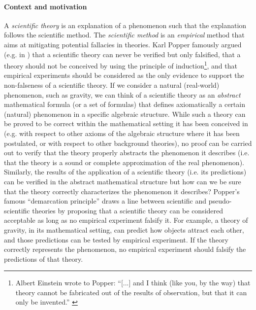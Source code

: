 \documentclass[conference]{IEEEtran}
\begin{document}
\paragraph{Context and motivation} 
A \emph{scientific theory} is an explanation of a phenomenon such that the
explanation follows the scientific method. The \emph{scientific method} is an
\emph{empirical} method that aims at mitigating potential fallacies in
theories.  Karl Popper famously argued (e.g. in \autocite{Popper1959logic})
that a scientific theory can never be verified but only falsified, that a
theory should not be conceived by using the principle of
induction\footnote{Albert  Einstein wrote to Popper: ``[...] and I think (like
you, by the way) that theory cannot be fabricated out of the results of
observation, but that it can only be invented.'' \autocite{Popper1959logic}},
and that empirical experiments should be considered as the only evidence to
support the non-falseness of a scientific theory. 
If we consider a natural (real-world) phenomenon, such as gravity, we can think
of a scientific theory as an \emph{abstract} mathematical formula (or a set of
formulas) that defines axiomatically a certain (natural) phenomenon in a
specific algebraic structure. While such a theory can be proved to be correct
within the mathematical setting it has been conceived in (e.g. with respect to
other axioms of the algebraic structure where it has been postulated, or with
respect to other background theories), no proof can be carried out to verify
that the theory properly abstracts the phenomenon it describes (i.e. that the
theory is a sound or complete approximation of the real phenomenon).
Similarly, the results of the application of a scientific theory (i.e. its
predictions) can be verified in the abstract mathematical structure but how can
we be sure that the theory correctly characterizes the phenomenon it describes? 
Popper's famous ``demarcation principle'' draws a line between scientific and
pseudo-scientific theories by proposing that a scientific theory can
be considered acceptable as long as no empirical experiment falsify it. For
example, a theory of gravity, in its mathematical setting, can predict how
objects attract each other, and those predictions can be tested by empirical
experiment. If the theory correctly represents the phenomenon, no empirical
experiment should falsify the predictions of that theory.
\end{document}

